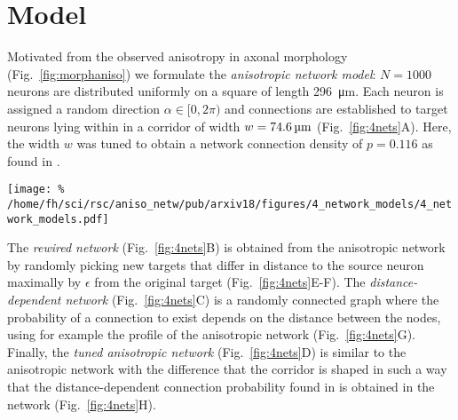 
\vspace{-1.5cm}
\section*{Model}
\vspace{-0.2cm}

Motivated from the observed anisotropy in axonal morphology (Fig.~\ref{fig:morphaniso}) we formulate the \textit{anisotropic network model}: $N=1000$ neurons are distributed uniformly on a square of length \SI{296}{\micro\meter}. Each neuron is assigned a random direction $\alpha \in [0,2\pi)$ and connections are established to target neurons lying within in a corridor of width $w=\text{\SI{74.6}{\micro\meter}}$ (Fig.~\ref{fig:4nets}A). Here, the width $w$ was tuned to obtain a network connection density of $p=0.116$ as found in \cite{Song2005}.

\begin{center}\vspace{0.3cm}
  \texttt{[image: \%
    /home/fh/sci/rsc/aniso\_netw/pub/arxiv18/figures/4\_network\_models/4\_network\_models.pdf]}
  \label{fig:4nets}
\end{center}\vspace{2cm}

The \textit{rewired network} (Fig.~\ref{fig:4nets}B) is obtained from the anisotropic network by randomly picking new targets that differ in distance to the source neuron maximally by $\epsilon$ from the original target (Fig.~\ref{fig:4nets}E-F). The \textit{distance-dependent network} (Fig.~\ref{fig:4nets}C) is a randomly connected graph where the probability of a connection to exist depends on the distance between the nodes, using for example the profile of the anisotropic network (Fig.~\ref{fig:4nets}G). Finally, the \textit{tuned anisotropic network} (Fig.~\ref{fig:4nets}D) is similar to the anisotropic network with the difference that the corridor is shaped in such a way that the distance-dependent connection probability found in \cite{Perin2011} is obtained in the network (Fig.~\ref{fig:4nets}H).



